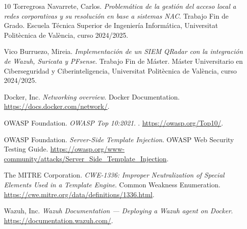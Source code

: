 \documentclass[11pt,spanish,listoffigures,listoftables]{tfgetsinf}
\begin{document}
\begin{thebibliography}{10}
   Torregrosa Navarrete, Carlos.
   \newblock \textit{Problemática de la gestión del acceso local a redes
   corporativas y su resolución en base a sistemas NAC}.
   \newblock Trabajo Fin de Grado. Escuela Técnica Superior de Ingeniería
   Informática, Universitat Politècnica de València, curso 2024/2025.

   Vico Burruezo, Mireia.
   \newblock \textit{Implementación de un SIEM QRadar con la integración de
   Wazuh, Suricata y PFsense}.
   \newblock Trabajo Fin de Máster. Máster Universitario en Ciberseguridad y
   Ciberinteligencia, Universitat Politècnica de València, curso 2024/2025.

   Docker, Inc.
   \newblock \textit{Networking overview}.
   \newblock Docker Documentation.
   \newblock \url{https://docs.docker.com/network/}.

   OWASP Foundation.
   \newblock \textit{OWASP Top 10:2021}.
   .
   \newblock \url{https://owasp.org/Top10/}.

   OWASP Foundation.
   \newblock \textit{Server-Side Template Injection}.
   \newblock OWASP Web Security Testing Guide.
   \newblock \url{https://owasp.org/www-community/attacks/Server_Side_Template_Injection}.

   The MITRE Corporation.
   \newblock \textit{CWE-1336: Improper Neutralization of Special Elements Used
   in a Template Engine}.
   \newblock Common Weakness Enumeration.
   \newblock \url{https://cwe.mitre.org/data/definitions/1336.html}.

   Wazuh, Inc.
   \newblock \textit{Wazuh Documentation — Deploying a Wazuh agent on Docker}.
   \newblock \url{https://documentation.wazuh.com/}.

\end{thebibliography}
\cleardoublepage


\APPENDIX

\end{document}
